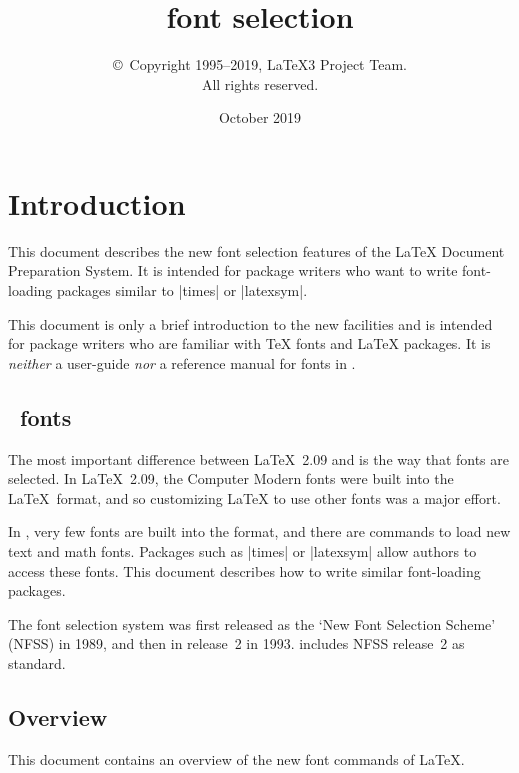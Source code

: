 \documentclass{ltxguide}[1995/11/28]
\title{\LaTeXe{} font selection}
\author{\copyright~Copyright 1995--2019, \LaTeX3 Project Team.\\
   All rights reserved.}
\date{October 2019}
\begin{document}
 
\maketitle
 
\tableofcontents
 
\section{Introduction}
 
This document describes the new font selection features of the \LaTeX{}
Document Preparation System.  It is intended for package writers who
want to write font-loading packages similar to |times| or |latexsym|.

This document is only a brief introduction to the new facilities and
is intended for package writers who are familiar with \TeX{} fonts and
\LaTeX{} packages.  It is \emph{neither} a user-guide \emph{nor} a
reference manual for fonts in \LaTeXe.
 
\subsection{\LaTeXe~fonts}
 
The most important difference between \LaTeX~2.09 and \LaTeXe{} is the
way that fonts are selected.  In \LaTeX~2.09, the Computer Modern fonts
were built into the \LaTeX~format, and so customizing \LaTeX{} to use
other fonts was a major effort.
 
In \LaTeXe, very few fonts are built into the format, and there are
commands to load new text and math fonts.  Packages such as |times| or
|latexsym| allow authors to access these fonts.
This document describes how to write similar font-loading packages.
 
The \LaTeXe{} font selection system was first released as the `New Font
Selection Scheme' (NFSS) in 1989, and then in release~2 in 1993.
\LaTeXe{} includes NFSS release~2 as standard.
 
\subsection{Overview}
 
This document contains an overview of the new font commands
of \LaTeX.
 
\end{document}
